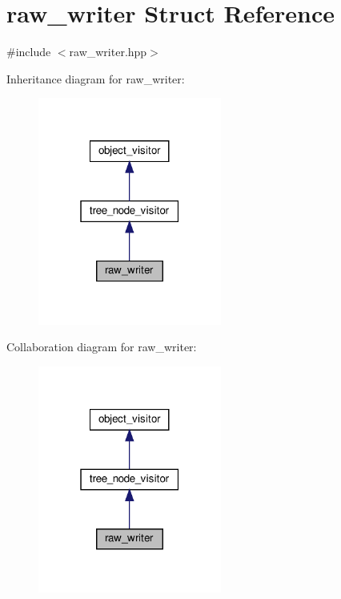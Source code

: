 \hypertarget{structraw__writer}{}\section{raw\+\_\+writer Struct Reference}
\label{structraw__writer}


{\ttfamily \#include $<$raw\+\_\+writer.\+hpp$>$}



Inheritance diagram for raw\+\_\+writer\+:
\nopagebreak
\begin{figure}[H]
\begin{center}
\leavevmode
\includegraphics[width=171pt]{df/d1c/structraw__writer__inherit__graph}
\end{center}
\end{figure}


Collaboration diagram for raw\+\_\+writer\+:
\nopagebreak
\begin{figure}[H]
\begin{center}
\leavevmode
\includegraphics[width=171pt]{de/d29/structraw__writer__coll__graph}
\end{center}
\end{figure}
